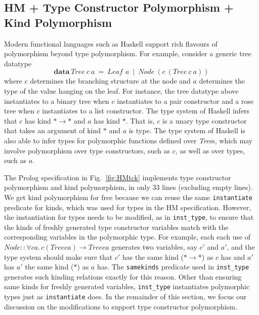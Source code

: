 \documentclass[runningheads,a4paper]{llncs}
\begin{document}
\subsection{HM + Type Constructor Polymorphism + Kind Polymorphism}
\label{ssec:HMtck}
Modern functional languages such as Haskell support rich flavours of
polymorphism beyond type polymorphism. For example, consider
a generic tree datatype
\[ \textbf{data}~\textit{Tree}~c~a
  ~=~ \textit{Leaf}\,~a ~\mid~ \textit{Node}~(c~(Tree~c~a)) \]
where $c$ determines the branching structure at the node and $a$
determines the type of the value hanging on the leaf. For instance,
the tree datatype above instantiates to a binary tree
when $c$ instantiates to a pair constructor and
a rose tree when $c$ instantiates to a list constructor.
The type system of Haskell infers that $c$ has kind $*\to*$ and
$a$ has kind $*$. That is, $c$ is a unary type constructor
that takes an argument of kind $*$ and $a$ is type. The type system of
Haskell is also able to infer types for polymorphic functions defined
over \textit{Tree}s, which may involve polymorphism over type constructors,
such as $c$, as well as over types, such as $a$.

The Prolog specification in Fig.~\ref{fig:HMtck} implements
type constructor polymorphism and kind polymorphism, in only 33 lines
(excluding empty lines). We get kind polymorphism for free because
we can reuse the same \verb|instantiate| predicate for kinds, which was
used for types in the HM specification. However, the instantiation for
types needs to be modified, as in \verb|inst_type|, to ensure that
the kinds of freshly generated type constructor variables match with
the corresponding variables in the polymorphic type. For example, each
each use of $\textit{Node} :\!: \forall c a.\, c (Tree c a) \to Tree c a$
generates two variables, say $c'$ and $a'$, and the type system should make
sure that $c'$ has the same kind ($*\to*$) as $c$ has and $a'$ has $a'$
the same kind ($*$) as $a$ has. The \verb|samekinds| predicate used in
\verb|inst_type| generates such kinding relations exactly for this reason.
Other than ensuring same kinds for freshly generated variables,
\verb|inst_type| instantiates polymorphic types just as \verb|instantiate| does.
In the remainder of this section, we focus our discussion on the modifications
to support type constructor polymorphism.
\end{document}
